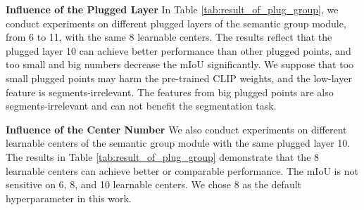 \documentclass{article}
\theoremstyle{plain}
\theoremstyle{definition}
\theoremstyle{remark}
\begin{document}
\vspace{0.1cm}
\noindent
\textbf{Influence of the Plugged Layer} \quad 
In Table \ref{tab:result_of_plug_group}, we conduct experiments on different plugged layers of the semantic group module, from 6 to 11, with the same 8 learnable centers. The results reflect that the plugged layer 10 can achieve better performance than other plugged points, and too small and big numbers decrease the mIoU significantly. We suppose that too small plugged points may harm the pre-trained CLIP weights, and the low-layer feature is segments-irrelevant. The features from big plugged points are also segments-irrelevant and can not benefit the segmentation task.

\vspace{0.1cm}
\noindent
\textbf{Influence of the Center Number} \quad
We also conduct experiments on different learnable centers of the semantic group module with the same plugged layer 10. The results in Table \ref{tab:result_of_plug_group} demonstrate that the 8 learnable centers can achieve better or comparable performance. The mIoU is not sensitive on 6, 8, and 10 learnable centers. We chose 8 as the default hyperparameter in this work.
\end{document}
